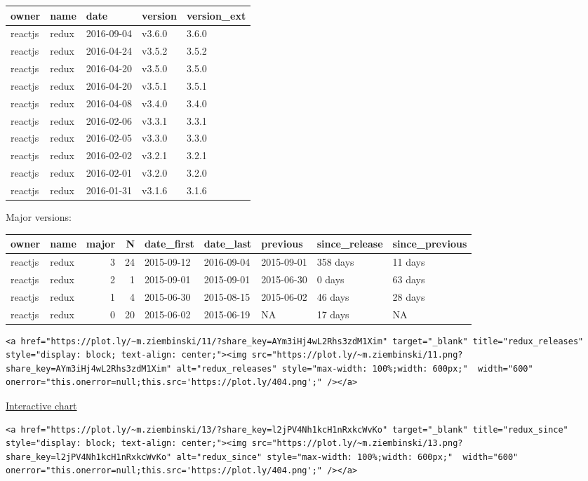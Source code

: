 \begin{longtable}[]{@{}lllll@{}}
\toprule
owner & name & date & version & version\_ext\tabularnewline
\midrule
\endhead
reactjs & redux & 2016-09-04 & v3.6.0 & 3.6.0\tabularnewline
reactjs & redux & 2016-04-24 & v3.5.2 & 3.5.2\tabularnewline
reactjs & redux & 2016-04-20 & v3.5.0 & 3.5.0\tabularnewline
reactjs & redux & 2016-04-20 & v3.5.1 & 3.5.1\tabularnewline
reactjs & redux & 2016-04-08 & v3.4.0 & 3.4.0\tabularnewline
reactjs & redux & 2016-02-06 & v3.3.1 & 3.3.1\tabularnewline
reactjs & redux & 2016-02-05 & v3.3.0 & 3.3.0\tabularnewline
reactjs & redux & 2016-02-02 & v3.2.1 & 3.2.1\tabularnewline
reactjs & redux & 2016-02-01 & v3.2.0 & 3.2.0\tabularnewline
reactjs & redux & 2016-01-31 & v3.1.6 & 3.1.6\tabularnewline
\bottomrule
\end{longtable}

Major versions:

\begin{longtable}[]{@{}llrrlllll@{}}
\toprule
owner & name & major & N & date\_first & date\_last & previous &
since\_release & since\_previous\tabularnewline
\midrule
\endhead
reactjs & redux & 3 & 24 & 2015-09-12 & 2016-09-04 & 2015-09-01 & 358
days & 11 days\tabularnewline
reactjs & redux & 2 & 1 & 2015-09-01 & 2015-09-01 & 2015-06-30 & 0 days
& 63 days\tabularnewline
reactjs & redux & 1 & 4 & 2015-06-30 & 2015-08-15 & 2015-06-02 & 46 days
& 28 days\tabularnewline
reactjs & redux & 0 & 20 & 2015-06-02 & 2015-06-19 & NA & 17 days &
NA\tabularnewline
\bottomrule
\end{longtable}

\begin{verbatim}
<a href="https://plot.ly/~m.ziembinski/11/?share_key=AYm3iHj4wL2Rhs3zdM1Xim" target="_blank" title="redux_releases" style="display: block; text-align: center;"><img src="https://plot.ly/~m.ziembinski/11.png?share_key=AYm3iHj4wL2Rhs3zdM1Xim" alt="redux_releases" style="max-width: 100%;width: 600px;"  width="600" onerror="this.onerror=null;this.src='https://plot.ly/404.png';" /></a>
\end{verbatim}

\href{https://plot.ly/~m.ziembinski/11/}{Interactive chart}

\begin{verbatim}
<a href="https://plot.ly/~m.ziembinski/13/?share_key=l2jPV4Nh1kcH1nRxkcWvKo" target="_blank" title="redux_since" style="display: block; text-align: center;"><img src="https://plot.ly/~m.ziembinski/13.png?share_key=l2jPV4Nh1kcH1nRxkcWvKo" alt="redux_since" style="max-width: 100%;width: 600px;"  width="600" onerror="this.onerror=null;this.src='https://plot.ly/404.png';" /></a>
\end{verbatim}

